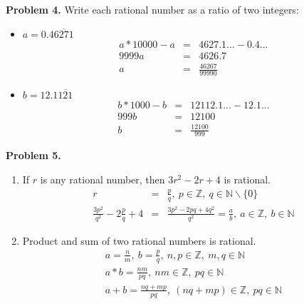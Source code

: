 \documentclass[a4paper,12pt]{article}
\newenvironment{problem}[1]{\par\bigskip\noindent\textbf{Problem #1.} \newline}{}
\begin{document}
  \begin{problem}{4}
    Write each rational number as a ratio of two integers:
    \begin{itemize}
    \item $a = 0.4\overline{6271}$ \\
      \begin{eqnarray*}
        a * 10000 - a &=& 4627.1... - 0.4... \\
        9999a &=& 4626.7\\
        a &=& \frac{46267}{99990}
      \end{eqnarray*}
    \item $b = 12.1\overline{121}$
      \begin{eqnarray*}
        b * 1000 - b &=& 12112.1... - 12.1... \\
        999b &=& 12100\\
        b &=& \frac{12100}{999}
      \end{eqnarray*}
    \end{itemize}
  \end{problem}
  
  \begin{problem}{5}
    \begin{enumerate}
    \item If $r$ is any rational number, then $3r^2 - 2r + 4$ is rational. \\
      \begin{eqnarray*}
        r &=& \frac{p}{q},\ p \in \mathbb{Z},\ q \in \mathbb{N} \backslash \{0\} \\
        \frac{3p^2}{q^2} - 2\frac{p}{q} + 4 &=& \frac{3p^2 - 2pq + 4q^2}{q^2} =
        \frac{a}{b},\ a \in \mathbb{Z},\ b \in \mathbb{N}
      \end{eqnarray*}
    \item Product and sum of two rational numbers is rational. \\
      \begin{eqnarray*}
        a = \frac{n}{m},\ b = \frac{p}{q},\ n,p \in \mathbb{Z},\ m,q \in \mathbb{N} \\
        a * b = \frac{nm}{pq},\ nm \in \mathbb{Z},\ pq \in \mathbb{N} \\
        a + b = \frac{nq + mp}{pq},\ (nq + mp) \in \mathbb{Z},\ pq \in \mathbb{N} \\

      \end{eqnarray*}
    \end{enumerate}
  \end{problem}
\end{document}
